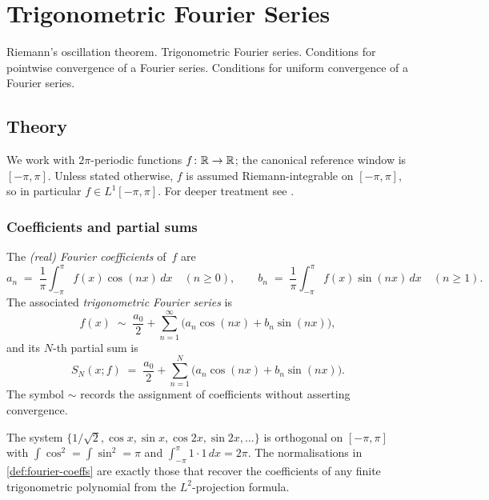 
\section{Trigonometric Fourier Series}
\label{sec:1.1.12-fourier-series}

\begin{ticket}
Riemann's oscillation theorem. Trigonometric Fourier series. Conditions for pointwise convergence of a Fourier series. Conditions for uniform convergence of a Fourier series.
\end{ticket}

\subsection*{Theory}

We work with $2\pi$-periodic functions $f \colon \mathbb{R} \to \mathbb{R}$; the
canonical reference window is $[-\pi, \pi]$. Unless stated otherwise,
$f$ is assumed Riemann-integrable on $[-\pi, \pi]$, so in particular
$f \in L^1[-\pi, \pi]$. For deeper treatment see
\cite[Vol.~II, Ch.~XVIII]{Zorich1981}.

\subsubsection*{Coefficients and partial sums}

\begin{definition}
\label{def:fourier-coeffs}
The \emph{(real) Fourier coefficients} of~$f$ are
\[
  a_n \;=\; \frac{1}{\pi} \int_{-\pi}^{\pi} f(x) \cos(nx)\, dx \quad (n \ge 0),
  \qquad
  b_n \;=\; \frac{1}{\pi} \int_{-\pi}^{\pi} f(x) \sin(nx)\, dx \quad (n \ge 1).
\]
The associated \emph{trigonometric Fourier series} is
\[
  f(x) \;\sim\; \frac{a_0}{2} + \sum_{n=1}^{\infty} \bigl(a_n \cos(nx) + b_n \sin(nx)\bigr),
\]
and its $N$-th partial sum is
\[
  S_N(x; f) \;=\; \frac{a_0}{2} + \sum_{n=1}^{N} \bigl(a_n \cos(nx) + b_n \sin(nx)\bigr).
\]
The symbol $\sim$ records the assignment of coefficients without
asserting convergence.
\end{definition}

\begin{remark}
The system
$\bigl\{1/\sqrt{2}, \cos x, \sin x, \cos 2x, \sin 2x, \dots\bigr\}$
is orthogonal on $[-\pi, \pi]$ with $\int \cos^2 = \int \sin^2 = \pi$
and $\int_{-\pi}^{\pi} 1 \cdot 1\, dx = 2\pi$. The normalisations in
\cref{def:fourier-coeffs} are exactly those that recover the
coefficients of any finite trigonometric polynomial from the
$L^2$-projection formula.
\end{remark}

